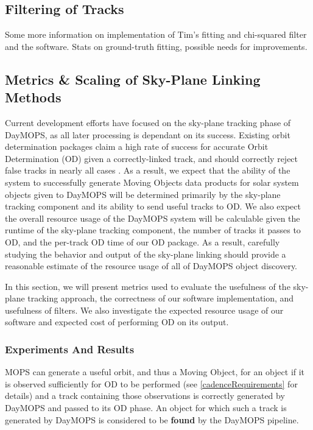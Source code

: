 \documentclass[12pt,preprint]{aastex}
\begin{document}
\subsection{Filtering of Tracks}
Some more information on implementation of Tim's fitting and
chi-squared filter and the software. Stats on ground-truth fitting,
possible needs for improvements.


\subsection{Metrics \& Scaling of Sky-Plane Linking Methods}

Current development efforts have focused on the sky-plane tracking
phase of DayMOPS, as all later processing is dependant on its
success. Existing orbit determination packages claim a high rate of
success for accurate Orbit Determination (OD) given a correctly-linked
track, and should correctly reject false tracks in nearly all cases
\citep{Milani2006}. As a result, we expect that the ability of the
system to successfully generate Moving Objects data products for solar
system objects given to DayMOPS will be determined primarily by the
sky-plane tracking component and its ability to send useful tracks to
OD.  We also expect the overall resource usage of the DayMOPS system
will be calculable given the runtime of the sky-plane tracking
component, the number of tracks it passes to OD, and the per-track OD
time of our OD package.  As a result, carefully studying the behavior
and output of the sky-plane linking should provide a reasonable
estimate of the resource usage of all of DayMOPS object discovery.


In this section, we will present metrics used to evaluate the
usefulness of the sky-plane tracking approach, the correctness of our
software implementation, and usefulness of filters. We also
investigate the expected resource usage of our software and expected cost
of performing OD on its output.



\subsubsection{Experiments And Results}

MOPS can generate a useful orbit, and thus a Moving Object, for an
object if it is observed sufficiently for OD to be performed (see
\ref{cadenceRequirements} for details) and a track containing those
observations is correctly generated by DayMOPS and passed to its OD
phase.  An object for which such a track is generated by DayMOPS is
considered to be \textbf{found} by the DayMOPS pipeline.  
\end{document}
